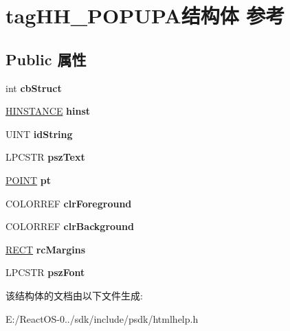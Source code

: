 \hypertarget{structtag_h_h___p_o_p_u_p_a}{}\section{tag\+H\+H\+\_\+\+P\+O\+P\+U\+P\+A结构体 参考}
\label{structtag_h_h___p_o_p_u_p_a}
\subsection*{Public 属性}
\begin{DoxyCompactItemize}
\item 
\mbox{\label{structtag_h_h___p_o_p_u_p_a_ac604c0801878ac93dc6a1f886074b039}} 
int {\bfseries cb\+Struct}
\item 
\mbox{\label{structtag_h_h___p_o_p_u_p_a_ad2f47ffd19444c219636cfadfb279fa7}} 
\hyperlink{interfacevoid}{H\+I\+N\+S\+T\+A\+N\+CE} {\bfseries hinst}
\item 
\mbox{\label{structtag_h_h___p_o_p_u_p_a_a142e61ceaa53363320f857204fe6f1a0}} 
U\+I\+NT {\bfseries id\+String}
\item 
\mbox{\label{structtag_h_h___p_o_p_u_p_a_a5c7087b91600b15eb0be2ba4dc5a5204}} 
L\+P\+C\+S\+TR {\bfseries psz\+Text}
\item 
\mbox{\label{structtag_h_h___p_o_p_u_p_a_afa0af27a88a027ca74ec78b9fc4c1781}} 
\hyperlink{structtag_p_o_i_n_t}{P\+O\+I\+NT} {\bfseries pt}
\item 
\mbox{\label{structtag_h_h___p_o_p_u_p_a_a931c79dd854d8701e56aa3c72ea4dbfb}} 
C\+O\+L\+O\+R\+R\+EF {\bfseries clr\+Foreground}
\item 
\mbox{\label{structtag_h_h___p_o_p_u_p_a_aa5ef337985cedd3d1255a22feb9c4141}} 
C\+O\+L\+O\+R\+R\+EF {\bfseries clr\+Background}
\item 
\mbox{\label{structtag_h_h___p_o_p_u_p_a_a05a1fa5a0d5f8fcfb98502dcf2414ed1}} 
\hyperlink{structtag_r_e_c_t}{R\+E\+CT} {\bfseries rc\+Margins}
\item 
\mbox{\label{structtag_h_h___p_o_p_u_p_a_a1ca9fbf7003919786280efd8bc3980e8}} 
L\+P\+C\+S\+TR {\bfseries psz\+Font}
\end{DoxyCompactItemize}


该结构体的文档由以下文件生成\+:\begin{DoxyCompactItemize}
\item 
E\+:/\+React\+O\+S-\/0../sdk/include/psdk/htmlhelp.\+h\end{DoxyCompactItemize}

